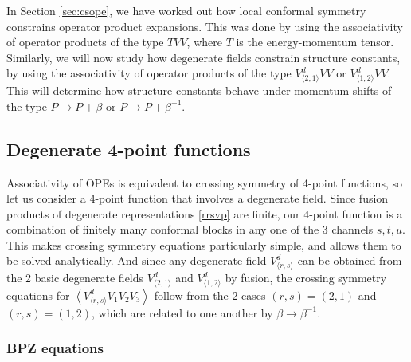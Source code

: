 \documentclass[12pt, a4paper]{article}
\theoremstyle{break}
\begin{document}
In Section \ref{sec:csope}, we have worked out how local conformal symmetry constrains operator product expansions. This was done by using the associativity of operator products of the type $TVV$, where $T$ is the energy-momentum tensor. Similarly, we will now study how degenerate fields constrain structure constants, by using the associativity of 
operator products of the type $V^d_{\langle 2,1\rangle}VV$ or $V^d_{\langle 1,2\rangle}VV$.  
This will determine how structure constants behave under momentum shifts of the type $P\to P+ \beta$ or $P\to P+ \beta^{-1}$. 

\subsection{Degenerate 4-point functions}

Associativity of OPEs is equivalent to crossing symmetry of 4-point functions, so let us consider a 4-point function that involves a degenerate field. Since fusion products of degenerate representations \eqref{rrsvp} are finite, our 4-point function is a combination of finitely many conformal blocks in any one of the 3 channels $s,t,u$. This makes crossing symmetry equations particularly simple, and allows them to be solved analytically. 
And since any degenerate field $V^d_{\langle r,s\rangle}$ can be obtained from the 2 basic degenerate fields $V^d_{\langle 2,1\rangle}$ and $V^d_{\langle 1,2\rangle}$ by fusion, the crossing symmetry equations for $\left<V^d_{\langle r,s\rangle}V_1V_2V_3\right>$ follow from the 2 cases $(r,s)=(2,1)$ and $(r,s)=(1,2)$, which are related to one another by $\beta\to \beta^{-1}$.  

\subsubsection{BPZ equations}
\end{document}
